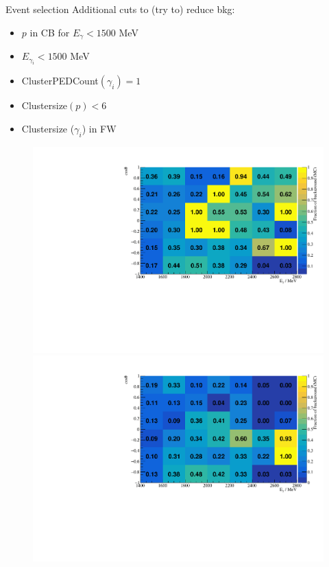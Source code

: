 \documentclass[11pt,aspectratio=169,dvipsnames]{beamer}
\begin{document}
	\begin{frame}{Event selection}
		Additional cuts to (try to) reduce bkg: 
		\begin{itemize}
			\item $p$ in CB for $E_\gamma<1500$ MeV
			\item $E_{\gamma_{i}}<1500$ MeV
			\item ClusterPEDCount$(\gamma_i)=1$
			\item Clustersize$(p)<6$
			\item Clustersize ($\gamma_{i}$) in FW
		\end{itemize}
		\begin{figure}
			\centering
			\includegraphics[width=.49\linewidth]{../../figs/hydrogen/bin_cuts/invcut_bkg_percentage.pdf}
			\includegraphics[width=.49\linewidth]{../../figs/hydrogen/bin_cuts_alt/invcut_bkg_percentage.pdf}
		\end{figure}
	\end{frame}
\end{document}
